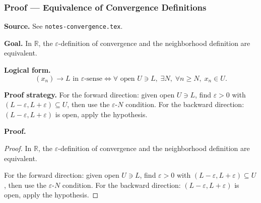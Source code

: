 
\clearpage
{}
\hypertarget{proof-RA-ABB-T-equiv-conv-defns}{}

\subsubsection[Equivalence of Convergence Definitions]{Proof --- Equivalence of Convergence Definitions}

\bigskip

\noindent
\textbf{Source.}
See \texttt{notes-convergence.tex}.

\vspace{0.75em}

\noindent
\textbf{Goal.}
In $\mathbb{R}$, the $\varepsilon$-definition of convergence and the neighborhood definition are equivalent.

\vspace{0.75em}

\noindent
\textbf{Logical form.}
\[
  (x_n) \to L \text{ in } \varepsilon\text{-sense} \Longleftrightarrow \forall \text{ open } U \ni L,\; \exists N,\; \forall n \ge N,\; x_n \in U.
\]

\vspace{0.75em}

\noindent
\textbf{Proof strategy.}
For the forward direction: given open $U \ni L$, find $\varepsilon > 0$ with $(L-\varepsilon, L+\varepsilon) \subseteq U$, then use the $\varepsilon$-$N$ condition. For the backward direction: $(L-\varepsilon, L+\varepsilon)$ is open, apply the hypothesis.

\vspace{0.75em}

\noindent
\textbf{Proof.}
\begin{proof}
\Claim In $\mathbb{R}$, the $\varepsilon$-definition of convergence and the neighborhood definition are equivalent.

\Given 

\Goal 

\Strategy For the forward direction: given open $U \ni L$, find $\varepsilon > 0$ with $(L-\varepsilon, L+\varepsilon) \subseteq U$, then use the $\varepsilon$-$N$ condition. For the backward direction: $(L-\varepsilon, L+\varepsilon)$ is open, apply the hypothesis.

\medskip


\end{proof}


